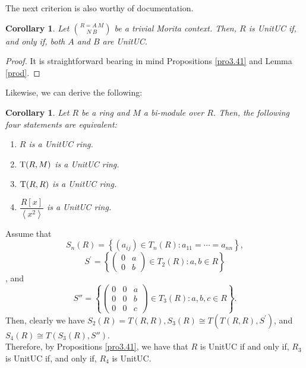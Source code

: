 \documentclass[12pt]{amsart}
\newtheorem{corollary}[theorem]{Corollary}
\theoremstyle{definition}
\begin{document}
The next criterion is also worthy of documentation.

\begin{corollary}\label{cor3.38}
Let $R=A~M \choose N~B$ be a trivial Morita context. Then, $R$ is   UnitUC if, and only if, both $A$ and $B$ are   UnitUC.
\end{corollary}

\begin{proof}
It is straightforward bearing in mind Propositions \ref{pro3.41} and Lemma \ref{prod}.
\end{proof}

Likewise, we can derive the following:

\begin{corollary}\label{cor3.43}
Let $R$ be a ring and $M$ a bi-module over $R$. Then, the following four statements are equivalent:
\begin{enumerate}
\item
$R$ is a   UnitUC ring.
\item
${\rm T}(R, M)$ is a   UnitUC ring.
\item
${\rm T}(R, R)$ is a   UnitUC ring.
\item
$\dfrac{R[x]}{\left\langle x^2 \right\rangle}$ is a   UnitUC ring.
\end{enumerate}
\end{corollary}

Assume that 
$$S_n(R) =\left\{(a_{ij}) \in T_n(R) : a_{11}= \cdots = a_{nn}\right\} ,$$
 $$S^{\prime} = \left \{\begin{pmatrix}
    0 & a\\ 0 & b
\end{pmatrix}
\in T_2(R) : a, b \in R \right \}$$, 
 and   $$S'' = \left \{
\begin{pmatrix}
   0 & 0 & a\\ 0 & 0 & b\\ 0 & 0 & c
\end{pmatrix}
\in T_3(R) : a, b, c \in R \right \}.$$ Then, clearly we have $S_2(R) = T(R,R), S_3(R) \cong T(T(R,R),S^{\prime})$, and  $S_4(R) \cong T(S_3(R),S'')$.\\ Therefore, by Propositions \ref{pro3.41}, we have that $R$ is  UnitUC if and only if, $R_3$ is  UnitUC if, and only if, $R_4$ is   UnitUC.
\end{document}
